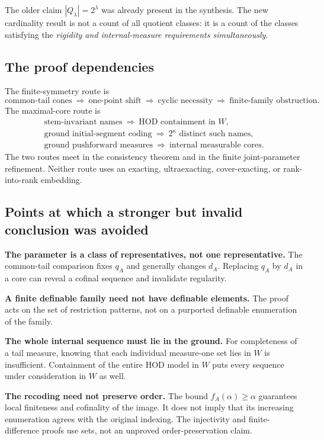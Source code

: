 \documentclass[11pt,letterpaper]{article}
\theoremstyle{definition}
\numberwithin{equation}{section}
\begin{document}
The older claim $|Q_\lambda|=2^\lambda$ was already present in the synthesis. The new cardinality result is not a count of all quotient classes: it is a count of the classes satisfying the \emph{rigidity and internal-measure requirements simultaneously}.

\subsection{The proof dependencies}

The finite-symmetry route is
\[
\text{common-tail cones}
\ \Longrightarrow\ \text{one-point shift}
\ \Longrightarrow\ \text{cyclic necessity}
\ \Longrightarrow\ \text{finite-family obstruction}.
\]
The maximal-core route is
\[
\begin{gathered}
\text{stem-invariant names}\ \Longrightarrow\ \text{HOD containment in }W,\\
\text{ground initial-segment coding}\ \Longrightarrow\ 2^\kappa\text{ distinct such names},\\
\text{ground pushforward measures}\ \Longrightarrow\ \text{internal measurable cores}.
\end{gathered}
\]
The two routes meet in the consistency theorem and in the finite joint-parameter refinement. Neither route uses an exacting, ultraexacting, cover-exacting, or rank-into-rank embedding.

\subsection{Points at which a stronger but invalid conclusion was avoided}

\textbf{The parameter is a class of representatives, not one representative.} The common-tail comparison fixes $q_A$ and generally changes $d_A$. Replacing $q_A$ by $d_A$ in a core can reveal a cofinal sequence and invalidate regularity.

\textbf{A finite definable family need not have definable elements.} The proof acts on the set of restriction patterns, not on a purported definable enumeration of the family.

\textbf{The whole internal sequence must lie in the ground.} For completeness of a tail measure, knowing that each individual measure-one set lies in $W$ is insufficient. Containment of the entire HOD model in $W$ puts every sequence under consideration in $W$ as well.

\textbf{The recoding need not preserve order.} The bound $f_A(\alpha)\ge\alpha$ guarantees local finiteness and cofinality of the image. It does not imply that its increasing enumeration agrees with the original indexing. The injectivity and finite-difference proofs use sets, not an unproved order-preservation claim.
\end{document}
